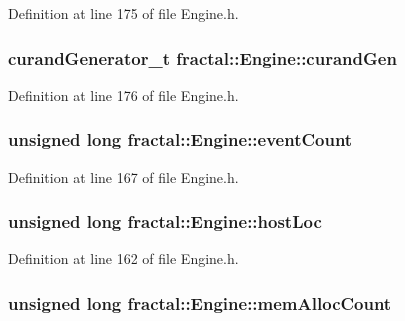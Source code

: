 Definition at line 175 of file Engine.\+h.

\hypertarget{classfractal_1_1Engine_a09c10e2ff4aee389a1a1af772def3f08}{
\subsubsection[{curand\+Gen}]{\setlength{\rightskip}{0pt plus 5cm}curand\+Generator\+\_\+t fractal\+::\+Engine\+::curand\+Gen\hspace{0.3cm}{\ttfamily [protected]}}}\label{classfractal_1_1Engine_a09c10e2ff4aee389a1a1af772def3f08}


Definition at line 176 of file Engine.\+h.

\hypertarget{classfractal_1_1Engine_a3b3e1a0a0ac3cf4d120429d023c0bd5f}{
\subsubsection[{event\+Count}]{\setlength{\rightskip}{0pt plus 5cm}unsigned long fractal\+::\+Engine\+::event\+Count\hspace{0.3cm}{\ttfamily [protected]}}}\label{classfractal_1_1Engine_a3b3e1a0a0ac3cf4d120429d023c0bd5f}


Definition at line 167 of file Engine.\+h.

\hypertarget{classfractal_1_1Engine_a044c1e5fff0b3a8b2090c2e47fe4cab5}{
\subsubsection[{host\+Loc}]{\setlength{\rightskip}{0pt plus 5cm}unsigned long fractal\+::\+Engine\+::host\+Loc\hspace{0.3cm}{\ttfamily [protected]}}}\label{classfractal_1_1Engine_a044c1e5fff0b3a8b2090c2e47fe4cab5}


Definition at line 162 of file Engine.\+h.

\hypertarget{classfractal_1_1Engine_ac2fb29fed1472e2763e47843f7f01ccb}{
\subsubsection[{mem\+Alloc\+Count}]{\setlength{\rightskip}{0pt plus 5cm}unsigned long fractal\+::\+Engine\+::mem\+Alloc\+Count\hspace{0.3cm}{\ttfamily [protected]}}}\label{classfractal_1_1Engine_ac2fb29fed1472e2763e47843f7f01ccb}


